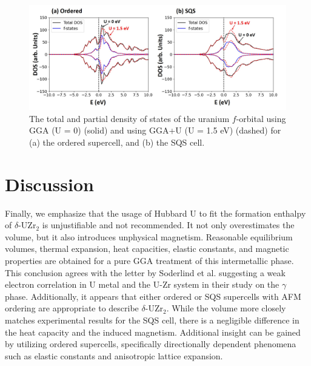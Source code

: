 \documentclass[preprint,12pt]{elsarticle}
\begin{document}
\begin{figure}[h!]
    \centering
    \includegraphics[scale=0.45]{DOS.jpg}
    \caption{The total and partial density of states of the uranium $f$-orbital using GGA (U = 0) (solid) and using GGA+U (U = 1.5 eV) (dashed) for (a) the ordered supercell, and (b) the SQS cell. }
    \label{fig:5}
\end{figure}

\section{Discussion}

Finally, we emphasize that the usage of Hubbard U to fit the formation enthalpy of $\delta$-UZr$_2$ is unjustifiable and not recommended. It not only overestimates the volume, but it also introduces unphysical magnetism. Reasonable equilibrium volumes, thermal expansion, heat capacities, elastic constants, and magnetic properties are obtained for a pure GGA treatment of this intermetallic phase. This conclusion agrees with the letter by Soderlind et al. \cite{soderlind_electron_2014} suggesting a weak electron correlation in U metal and the U-Zr system in their study on the $\gamma$ phase. Additionally, it appears that either ordered or SQS supercells with AFM ordering are appropriate to describe $\delta$-UZr$_2$. While the volume more closely matches experimental results for the SQS cell, there is a negligible difference in the heat capacity and the induced magnetism. Additional insight can be gained by utilizing ordered supercells, specifically directionally dependent phenomena such as elastic constants and anisotropic lattice expansion. 

\FloatBarrier
\end{document}
